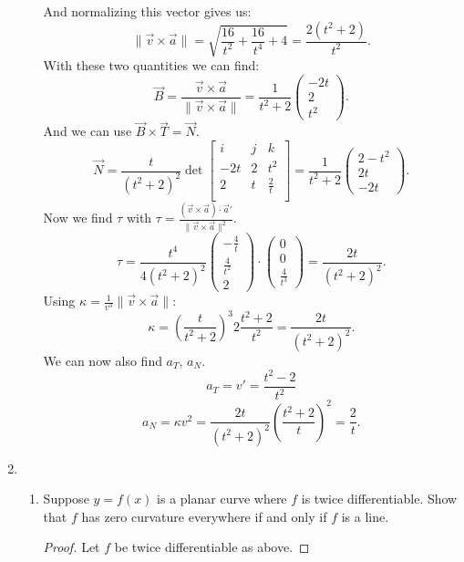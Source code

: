 \documentclass{article}
\begin{document}
\begin{enumerate}
\begin{enumerate}[label= (\alph*)]
        And normalizing this vector gives us:
        \[
        \|\vec{v}\times \vec{a}\|=\sqrt{\frac{16}{t^2}+\frac{16}{t^4}+4}
        =\frac{2(t^2+2)}{t^2}
        .\] 
        With these two quantities we can find:
        \[
            \vec{B}=\frac{\vec{v}\times \vec{a}}{\|\vec{v}\times \vec{a}\|}
            =
            \frac{1}{t^2+2}
            \begin{pmatrix} 
                -2t\\
                2\\
                t^2
            \end{pmatrix} 
        .\]     
        And we can use $\vec{B}\times \vec{T}=\vec{N}$.
        \[
            \vec{N}=\frac{t}{(t^2+2)^2}
            \det\begin{bmatrix} 
                i&j&k\\
                -2t&2&t^2\\
                2&t&\frac{2}{t}\\
            \end{bmatrix}
            =\frac{1}{t^2+2}\begin{pmatrix} 2-t^2\\2t\\-2t \end{pmatrix}  
        .\] 
        Now we find $\tau$ with $\tau= \frac{(\vec{v}\times \vec{a})\cdot \vec{a}'}{\|\vec{v}\times \vec{a}\|^{2}}$.
        \[
            \tau=\frac{t^4}{4(t^2+2)^2}\begin{pmatrix} -\frac{4}{t}\\\frac{4}{t^2}\\2 \end{pmatrix} 
            \cdot \begin{pmatrix} 0\\0\\ \frac{4}{t^3} \end{pmatrix} 
            =\frac{2t}{(t^2+2)^2}
        .\] 
        Using $\kappa =\frac{1}{v^3}\|\vec v \times \vec a\|$:
        \[
            \kappa=\left( \frac{t}{t^2+2} \right)^{3}2\frac{t^2+2}{t^2}=\frac{2t}{(t^2+2)^{2}} 
        .\] 
        We can now also find $a_T$, $a_N$.
        \[
        a_T=v'=\frac{t^2-2}{t^2}
        \] 
        \[
        a_N=\kappa v^2=\frac{2t}{(t^2+2)^{2}}\left(\frac{t^2+2}{t}  \right) ^2=\frac{2}{t}
        .\]            


    \end{enumerate}
\item
    \begin{enumerate}[label= (\alph*)] 
        \item Suppose $y = f (x)$ is a planar curve where $f$ is twice differentiable.
        Show that $f$ has zero curvature everywhere if and only if $f$ is a line.
        \begin{proof} 
            Let $f$ be twice differentiable as above.


\end{proof}
\end{enumerate}
\end{enumerate}
\end{document}
